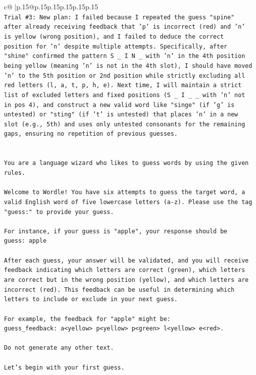 \documentclass{article}
\begin{document}
{\begin{supertabular}{c@{$\;$}|p{.15\linewidth}@{}p{.15\linewidth}p{.15\linewidth}p{.15\linewidth}p{.15\linewidth}p{.15\linewidth}}
{{{\\ 
\texttt{Trial \#3: New plan: I failed because I repeated the guess "spine" after already receiving feedback that 'p' is incorrect (red) and 'n' is yellow (wrong position), and I failed to deduce the correct position for 'n' despite multiple attempts. Specifically, after "shine" confirmed the pattern S \_ I N \_ with 'n' in the 4th position being yellow (meaning 'n' is not in the 4th slot), I should have moved 'n' to the 5th position or 2nd position while strictly excluding all red letters (l, a, t, p, h, e). Next time, I will maintain a strict list of excluded letters and fixed positions (S \_ I \_ \_ with 'n' not in pos 4), and construct a new valid word like "singe" (if 'g' is untested) or "sting" (if 't' is untested) that places 'n' in a new slot (e.g., 5th) and uses only untested consonants for the remaining gaps, ensuring no repetition of previous guesses.} \\
\\ 
\\ 
\texttt{You are a language wizard who likes to guess words by using the given rules.} \\
\\ 
\texttt{Welcome to Wordle! You have six attempts to guess the target word, a valid English word of five lowercase letters (a{-}z). Please use the tag "guess:" to provide your guess.} \\
\\ 
\texttt{For instance, if your guess is "apple", your response should be} \\
\texttt{guess: apple} \\
\\ 
\texttt{After each guess, your answer will be validated, and you will receive feedback indicating which letters are correct (green), which letters are correct but in the wrong position (yellow), and which letters are incorrect (red). This feedback can be useful in determining which letters to include or exclude in your next guess.} \\
\\ 
\texttt{For example, the feedback for "apple" might be:} \\
\texttt{guess\_feedback: a<yellow> p<yellow> p<green> l<yellow> e<red>.} \\
\\ 
\texttt{Do not generate any other text.} \\
\\ 
\texttt{Let's begin with your first guess.} \\
            }
        }
    }
     \\ \\


\end{supertabular}}
\end{document}
